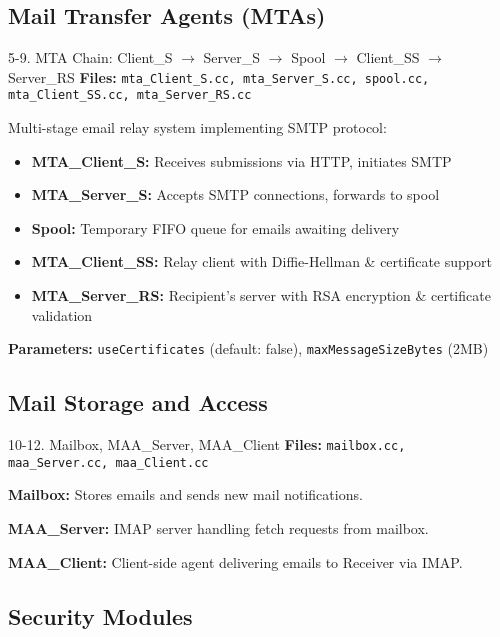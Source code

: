 \documentclass[a4paper,12pt]{extarticle}
\newcommand{\code}[1]{\texttt{\colorbox{codebackground}{#1}}}
\begin{document}
\subsection{Mail Transfer Agents (MTAs)}

\begin{modulebox}{5-9. MTA Chain: Client\_S $\rightarrow$ Server\_S $\rightarrow$ Spool $\rightarrow$ Client\_SS $\rightarrow$ Server\_RS}
\textbf{Files:} \code{mta\_Client\_S.cc, mta\_Server\_S.cc, spool.cc, mta\_Client\_SS.cc, mta\_Server\_RS.cc}

Multi-stage email relay system implementing SMTP protocol:
\begin{itemize}
    \item \textbf{MTA\_Client\_S:} Receives submissions via HTTP, initiates SMTP
    \item \textbf{MTA\_Server\_S:} Accepts SMTP connections, forwards to spool
    \item \textbf{Spool:} Temporary FIFO queue for emails awaiting delivery
    \item \textbf{MTA\_Client\_SS:} Relay client with Diffie-Hellman \& certificate support
    \item \textbf{MTA\_Server\_RS:} Recipient's server with RSA encryption \& certificate validation
\end{itemize}
\textbf{Parameters:} \code{useCertificates} (default: false), \code{maxMessageSizeBytes} (2MB)
\end{modulebox}

\vspace{0.5cm}

\subsection{Mail Storage and Access}

\begin{modulebox}{10-12. Mailbox, MAA\_Server, MAA\_Client}
\textbf{Files:} \code{mailbox.cc, maa\_Server.cc, maa\_Client.cc}

\textbf{Mailbox:} Stores emails and sends new mail notifications.

\textbf{MAA\_Server:} IMAP server handling fetch requests from mailbox.

\textbf{MAA\_Client:} Client-side agent delivering emails to Receiver via IMAP.
\end{modulebox}

\vspace{0.5cm}

\subsection{Security Modules}
\end{document}
